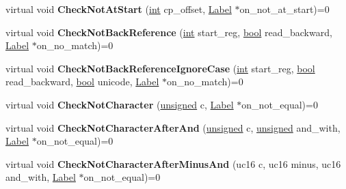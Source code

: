 \begin{DoxyCompactItemize}
virtual void {\bfseries Check\+Not\+At\+Start} (\mbox{\hyperlink{classint}{int}} cp\+\_\+offset, \mbox{\hyperlink{classv8_1_1internal_1_1Label}{Label}} $\ast$on\+\_\+not\+\_\+at\+\_\+start)=0
\item 
\mbox{\label{classv8_1_1internal_1_1RegExpMacroAssembler_a3f57a3263201ff4724ee6504a079d72a}} 
virtual void {\bfseries Check\+Not\+Back\+Reference} (\mbox{\hyperlink{classint}{int}} start\+\_\+reg, \mbox{\hyperlink{classbool}{bool}} read\+\_\+backward, \mbox{\hyperlink{classv8_1_1internal_1_1Label}{Label}} $\ast$on\+\_\+no\+\_\+match)=0
\item 
\mbox{\label{classv8_1_1internal_1_1RegExpMacroAssembler_a167317edcfc0cd3ef2326d7c08938875}} 
virtual void {\bfseries Check\+Not\+Back\+Reference\+Ignore\+Case} (\mbox{\hyperlink{classint}{int}} start\+\_\+reg, \mbox{\hyperlink{classbool}{bool}} read\+\_\+backward, \mbox{\hyperlink{classbool}{bool}} unicode, \mbox{\hyperlink{classv8_1_1internal_1_1Label}{Label}} $\ast$on\+\_\+no\+\_\+match)=0
\item 
\mbox{\label{classv8_1_1internal_1_1RegExpMacroAssembler_ae8333c77adc1f824766f1b8450e7135d}} 
virtual void {\bfseries Check\+Not\+Character} (\mbox{\hyperlink{classunsigned}{unsigned}} c, \mbox{\hyperlink{classv8_1_1internal_1_1Label}{Label}} $\ast$on\+\_\+not\+\_\+equal)=0
\item 
\mbox{\label{classv8_1_1internal_1_1RegExpMacroAssembler_afca08e02faa3cddd9ab89ecd5505e28c}} 
virtual void {\bfseries Check\+Not\+Character\+After\+And} (\mbox{\hyperlink{classunsigned}{unsigned}} c, \mbox{\hyperlink{classunsigned}{unsigned}} and\+\_\+with, \mbox{\hyperlink{classv8_1_1internal_1_1Label}{Label}} $\ast$on\+\_\+not\+\_\+equal)=0
\item 
\mbox{\label{classv8_1_1internal_1_1RegExpMacroAssembler_a6ec10ec5fa6560fa42fc8c473774852d}} 
virtual void {\bfseries Check\+Not\+Character\+After\+Minus\+And} (uc16 c, uc16 minus, uc16 and\+\_\+with, \mbox{\hyperlink{classv8_1_1internal_1_1Label}{Label}} $\ast$on\+\_\+not\+\_\+equal)=0
\item 
\mbox{\label{classv8_1_1internal_1_1RegExpMacroAssembler_a873c96a4e121d2d86129085b086d3ced}} 

\end{DoxyCompactItemize}
